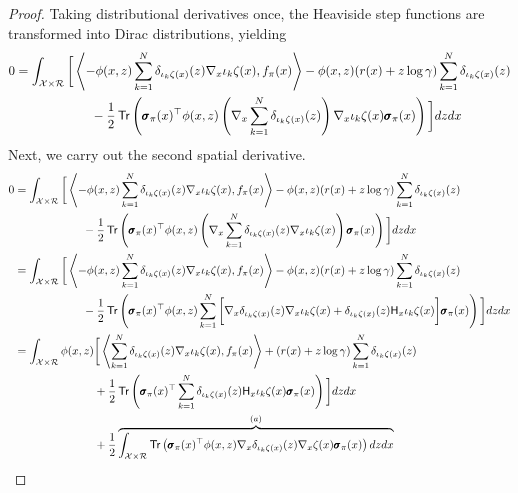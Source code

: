 \begin{proof}
  Taking distributional derivatives once, the Heaviside step functions are transformed into Dirac distributions, yielding
  \begin{align*}
    0
    &= \int_{\xxX\times\returnspace}\bigg[\left\langle-\phi(x,
      z)\sum_{k=1}^N\dirac{\proj{k}\statistics(x)}(z)\nabla_x\proj{k}\statistics(x),
      \xxf(x)\right\rangle - \phi(x, z)(r(x) +
      z\log\gamma)\sum_{k=1}^N\dirac{\proj{k}\statistics(x)}(z)\\ 
    &\qquad\qquad\qquad -
      \frac{1}{2}\trace\left(\quadraticform{\xxs(x)}{\phi(x,z)\left(\nabla_x\sum_{k=1}^N\dirac{\proj{k}\statistics(x)}(z)\right)\nabla_x\proj{k}\statistics(x)}\right)\bigg]dzdx\\
  \end{align*}
  Next, we carry out the second spatial derivative.
  \begin{align*}
    0
    &= \int_{\xxX\times\returnspace}\bigg[\left\langle-\phi(x,
      z)\sum_{k=1}^N\dirac{\proj{k}\statistics(x)}(z)\nabla_x\proj{k}\statistics(x),
      \xxf(x)\right\rangle - \phi(x, z)(r(x) +
      z\log\gamma)\sum_{k=1}^N\dirac{\proj{k}\statistics(x)}(z)\\ 
    &\qquad\qquad\qquad -
      \frac{1}{2}\trace\left(\quadraticform{\xxs(x)}{\phi(x,z)\left(\nabla_x\sum_{k=1}^N\dirac{\proj{k}\statistics(x)}(z)\nabla_x\proj{k}\statistics(x)\right)}\right)\bigg]dzdx\\ 
    &= \int_{\xxX\times\returnspace}\bigg[\left\langle-\phi(x,
      z)\sum_{k=1}^N\dirac{\proj{k}\statistics(x)}(z)\nabla_x\proj{k}\statistics(x),
      \xxf(x)\right\rangle - \phi(x, z)(r(x) +
      z\log\gamma)\sum_{k=1}^N\dirac{\proj{k}\statistics(x)}(z)\\ 
    &\qquad\qquad\qquad -
      \frac{1}{2}\trace\left(\quadraticform{\xxs(x)}{\phi(x,z)\sum_{k=1}^N\bigg[\nabla_x\dirac{\proj{k}\statistics(x)}(z)\nabla_x\proj{k}\statistics(x)
      +
      \dirac{\proj{k}\statistics(x)}(z)\hessian{x}\proj{k}\statistics(x)\bigg]}\right)\bigg]dzdx\\ 
    &= \int_{\xxX\times\returnspace}\phi(x,
      z)\bigg[\left\langle\sum_{k=1}^N\dirac{\proj{k}\statistics(x)}(z)\nabla_x\proj{k}\statistics(x),
      \xxf(x)\right\rangle + (r(x) +
      z\log\gamma)\sum_{k=1}^N\dirac{\proj{k}\statistics(x)}(z)\\ 
    &\qquad\qquad\qquad\quad +
      \frac{1}{2}\trace\left(\quadraticform{\xxs(x)}{\sum_{k=1}^N
      \dirac{\proj{k}\statistics(x)}(z)\hessian{x}\proj{k}\statistics(x)}\right)\bigg]dzdx\\ 
    &\qquad\qquad\qquad\quad + \frac{1}{2}
      \overbrace{\int_{\xxX\times\returnspace}\trace\left(\quadraticform{\xxs(x)}{\phi(x,
      z)\nabla_x\dirac{\proj{k}\statistics(x)}(z)\nabla_x\statistics(x)}\right)dzdx}^{(a)}\\ 
  \end{align*}
    

\end{proof}
